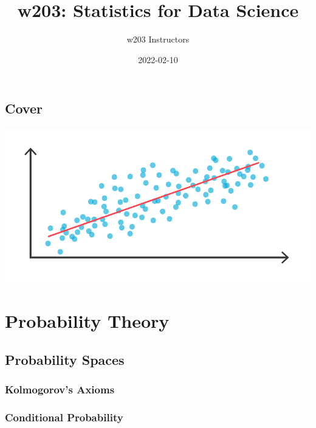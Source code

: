 \documentclass[
]{book}
\title{w203: Statistics for Data Science}
\author{w203 Instructors}
\date{2022-02-10}
\theoremstyle{definition}
\theoremstyle{definition}
\theoremstyle{definition}
\theoremstyle{definition}
\theoremstyle{remark}
\begin{document}
\maketitle

{
\hypersetup{linkcolor=}
\setcounter{tocdepth}{1}
\tableofcontents
}
\newcommand{\E}[1]{{\mathbb{E}\left[ #1 \right]}}
\newcommand{\V}[1]{{\mathbb{V}\left[ #1 \right]}}
\newcommand{\C}[1]{{\text{Cov}\left[ #1 \right]}}
\newcommand{\v}[1]{{\boldsymbol{#1}}}
\newcommand{\m}[1]{{\mathbb{#1}}}

\hypertarget{cover}{%
\chapter*{Cover}\label{cover}}

\includegraphics[width=0.85\linewidth]{./images/cover}

\hypertarget{part-probability-theory}{%
\part{Probability Theory}\label{part-probability-theory}}

\hypertarget{probability-spaces}{%
\chapter{Probability Spaces}\label{probability-spaces}}

\hypertarget{kolmogorovs-axioms}{%
\section{Kolmogorov's Axioms}\label{kolmogorovs-axioms}}

\hypertarget{conditional-probability}{%
\section{Conditional Probability}\label{conditional-probability}}
\end{document}
